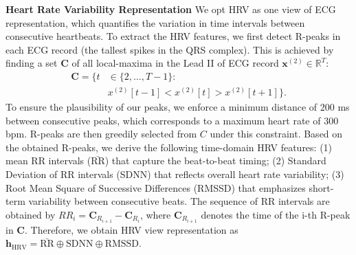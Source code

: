 \documentclass[twocolumn]{cinc}
\begin{document}
\noindent \textbf{Heart Rate Variability Representation}
We opt HRV as one view of ECG representation, which quantifies the variation in time intervals between consecutive heartbeats.
To extract the HRV features, we first detect R-peaks in each ECG record (the tallest spikes in the QRS complex). This is achieved by finding  a set $\mathbf{C}$ of all local-maxima in the Lead II of ECG record $\mathbf{x}^{(2)}\in \mathbb{R}^T$:
\begin{equation}
    \begin{aligned}
        \mathbf{C} = \{t & \in \{2, \dots, T-1\}: \\
        & x^{(2)}[t-1]<x^{(2)}[t]>x^{(2)}[t+1]\}.
    \end{aligned}
    \label{peaks}
\end{equation}
To ensure the plausibility of our peaks, we enforce a minimum distance of 200 ms between consecutive peaks, which corresponds to a maximum heart rate of 300 bpm. R-peaks are then greedily selected from $C$ under this constraint. %
Based on the obtained R-peaks, we derive the following time-domain HRV features: (1) mean RR intervals ($\bar{\text{RR}}$) that capture the beat-to-beat timing; (2) Standard Deviation of RR intervals (SDNN) that reflects overall heart rate variability; (3) Root Mean Square of Successive Differences (RMSSD) that emphasizes short-term variability between consecutive beats. The sequence of RR intervals are obtained by $RR_i=\mathbf{C}_{R_{i+1}}-\mathbf{C}_{R_i}$,
where $\mathbf{C}_{R_{i+1}}$ denotes the time of the i-th R-peak in $\mathbf{C}$. Therefore, we obtain HRV view representation as $\mathbf{h}_{\text{HRV}}=\bar{\text{RR}}\oplus \text{SDNN} \oplus \text{RMSSD}$.


\end{document}
